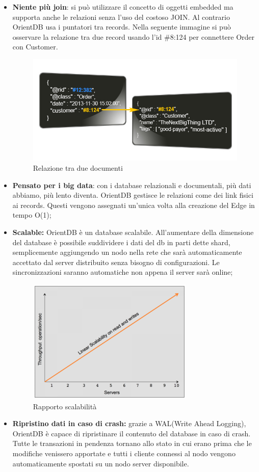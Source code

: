 \begin{itemize}
	\item \textbf{Niente più join}: si può utilizzare il concetto di oggetti embedded ma supporta anche le relazioni senza l'uso del costoso JOIN. Al contrario OrientDB usa i puntatori tra records. Nella seguente immagine si può osservare la relazione tra due record usando l'id \#8:124 per connettere Order con Customer.
	\begin{figure}[h]
	\centering
	\includegraphics[width=0.7\linewidth]{immagini/json_linked3}
	\caption[Relazione tra due documenti]{Relazione tra due documenti}
	\label{fig:json_linked3}
	\end{figure}
	
\newpage
\item \textbf{Pensato per i big data}: con i database relazionali e documentali, più dati abbiamo, più lento diventa. OrientDB gestisce le relazioni come dei link fisici ai records. Questi vengono assegnati un'unica volta alla creazione del Edge in tempo O(1);
\item \textbf{Scalable:} OrientDB è un database scalabile. All'aumentare della dimensione del database è possibile suddividere i dati del db in parti dette shard, semplicemente aggiungendo un nodo nella rete che sarà automaticamente accettato dal server distribuito senza bisogno di configurazioni. Le sincronizzazioni saranno automatiche non appena il server sarà online;
\begin{figure}[h]
\centering
\includegraphics[width=0.7\linewidth]{immagini/scalability}
\caption[Rapporto scalabilità]{Rapporto scalabilità}
\label{fig:scalability}
\end{figure}

\item \textbf{Ripristino dati in caso di crash:} grazie a WAL(Write Ahead Logging), OrientDB è capace di ripristinare il contenuto del database in caso di crash. Tutte le transazioni in pendenza tornano allo stato in cui erano prima che le modifiche venissero apportate e tutti i cliente connessi al nodo vengono automaticamente spostati su un nodo server disponibile.
\end{itemize}
